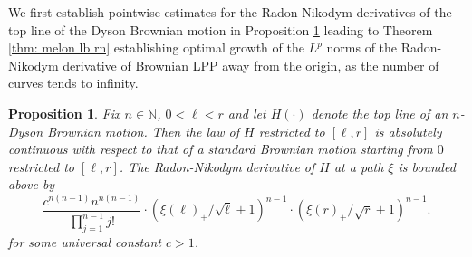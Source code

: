 \documentclass[11pt, reqno]{amsart}
\numberwithin{equation}{section}
\newcounter{dummy} \numberwithin{dummy}{section}
\newtheorem{proposition}[dummy]{Proposition}
\newcommand{\N}{\ensuremath{\mathbb{N}}}
\begin{document}
We first establish pointwise estimates for the Radon-Nikodym derivatives of the top line of the Dyson Brownian motion in Proposition \ref{prop: top line pitman pointwise bound general case} leading to Theorem \ref{thm: melon lb rn} establishing optimal growth of the $L^p$ norms of the Radon-Nikodym derivative of Brownian LPP away from the origin, as the number of curves tends to infinity.

\begin{proposition}\label{prop: top line pitman pointwise bound general case}Fix $n\in \N$, $0<\ell<r$ and let $H(\cdot)$ denote the top line of an $n$-Dyson Brownian motion. Then the law of $H$ restricted to $[\ell,r]$ is absolutely continuous with respect to that of a standard Brownian motion starting from $0$ restricted to $[\ell,r]$. The Radon-Nikodym derivative of $H$ at a path $\xi$ is bounded above by
\begin{equation*}
    \frac{c^{n(n-1)}n^{n(n-1)}}{\prod_{j=1}^{n-1}j!}\cdot (\xi(\ell)_+/\sqrt{\ell}+1)^{n-1}\cdot (\xi(r)_+/\sqrt{r}+1)^{n-1}.
\end{equation*}
for some universal constant $c>1$.
\end{proposition}
\end{document}
